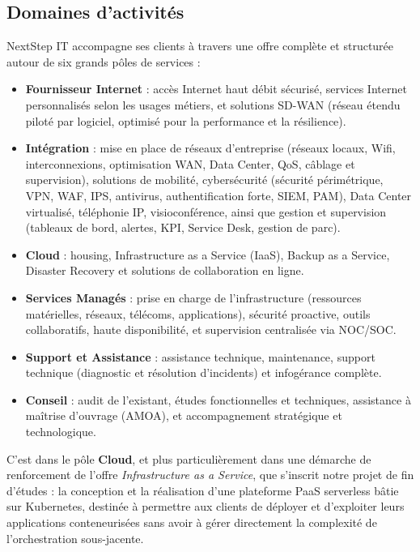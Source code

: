 \subsection{Domaines d'activités}

NextStep IT accompagne ses clients à travers une offre complète et structurée autour de six grands pôles de services :

\begin{itemize}
    \item \textbf{Fournisseur Internet} : accès Internet haut débit sécurisé, services Internet personnalisés selon les usages métiers, et solutions SD-WAN (réseau étendu piloté par logiciel, optimisé pour la performance et la résilience).

    \item \textbf{Intégration} : mise en place de réseaux d'entreprise (réseaux locaux, Wifi, interconnexions, optimisation WAN, Data Center, QoS, câblage et supervision), solutions de mobilité, cybersécurité (sécurité périmétrique, VPN, WAF, IPS, antivirus, authentification forte, SIEM, PAM), Data Center virtualisé, téléphonie IP, visioconférence, ainsi que gestion et supervision (tableaux de bord, alertes, KPI, Service Desk, gestion de parc).

    \item \textbf{Cloud} : housing, Infrastructure as a Service (IaaS), Backup as a Service, Disaster Recovery et solutions de collaboration en ligne.

    \item \textbf{Services Managés} : prise en charge de l'infrastructure (ressources matérielles, réseaux, télécoms, applications), sécurité proactive, outils collaboratifs, haute disponibilité, et supervision centralisée via NOC/SOC.

    \item \textbf{Support et Assistance} : assistance technique, maintenance, support technique (diagnostic et résolution d'incidents) et infogérance complète.

    \item \textbf{Conseil} : audit de l'existant, études fonctionnelles et techniques, assistance à maîtrise d'ouvrage (AMOA), et accompagnement stratégique et technologique.
\end{itemize}

C'est dans le pôle \textbf{Cloud}, et plus particulièrement dans une démarche de renforcement de l'offre \textit{Infrastructure as a Service}, que s'inscrit notre projet de fin d'études : la conception et la réalisation d'une plateforme PaaS serverless bâtie sur Kubernetes, destinée à permettre aux clients de déployer et d'exploiter leurs applications conteneurisées sans avoir à gérer directement la complexité de l'orchestration sous-jacente.


